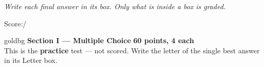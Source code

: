 \documentclass[12pt]{article}
\begin{document}
{\small\itshape Write each final answer in its box. Only what is inside a box is graded.}\par

\hfill\small Score:\;\blank{1.3cm}\;/\normalsize
\vspace{0.04in}

\boxguard[6]
\begin{headlinebox}{goldbg}
\small
\textbf{Section I --- Multiple Choice} \hfill \textbf{60 points, 4 each}\\
This is the \textbf{practice} test --- not scored. Write the letter of the single best answer in its Letter box.
\end{headlinebox}

\vspace{0.06in}
\end{document}
